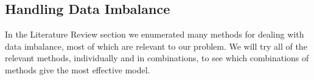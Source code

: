 \subsection{Handling Data Imbalance}

In the Literature Review section we enumerated many methods for dealing with data imbalance, most of which are relevant to our problem.  We will try all of the relevant methods, individually and in combinations, to see which combinations of methods give the most effective model.  


